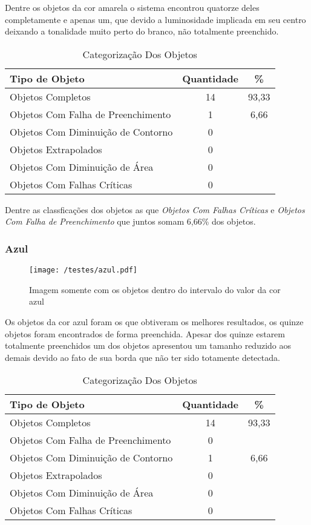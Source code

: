 	Dentre os objetos da cor amarela o sistema encontrou quatorze deles completamente e apenas um, que devido a luminosidade implicada em seu centro deixando a tonalidade muito perto do branco, não totalmente preenchido.
	
	\begin{table}[H]
\centering
\begin{tabular}{l|c|c}
Tipo de Objeto & Quantidade & \%  \\%
\hline                               %
Objetos Completos & 14 & 93,33 \\
\hline 
Objetos Com Falha de Preenchimento & 1 & 6,66 \\
\hline 
Objetos Com Diminuição de Contorno & 0 &\\
\hline 
Objetos Extrapolados & 0 &\\
\hline 
Objetos Com Diminuição de Área &  0 &\\
\hline 
Objetos Com Falhas Críticas & 0 &\\
\hline 
\end{tabular}
\caption{Categorização Dos Objetos}
\end{table}

Dentre as classficações dos objetos as que  \textit{Objetos Com Falhas Críticas} e \textit{Objetos Com Falha de Preenchimento} que juntos somam 6,66\% dos objetos.

\subsubsection{Azul}
	\begin{figure}[H]
		\centering
		\texttt{[image: /testes/azul.pdf]}
		\caption{Imagem somente com os objetos dentro do intervalo do valor da cor azul}
		\label{disposicaoparte}
	\end{figure}

Os objetos da cor azul foram os que obtiveram os melhores resultados, os quinze objetos foram encontrados de forma preenchida.	Apesar dos quinze estarem totalmente preenchidos um dos objetos apresentou um tamanho reduzido aos demais devido ao fato de sua borda que não ter sido totamente detectada.

\begin{table}[h]
\centering
\begin{tabular}{l|c|c}
Tipo de Objeto & Quantidade & \% \\ %
\hline                               %
Objetos Completos & 14 & 93,33 \\
\hline 
Objetos Com Falha de Preenchimento & 0\\
\hline 
Objetos Com Diminuição de Contorno &  1 & 6,66
\\
\hline 
Objetos Extrapolados &  0\\
\hline 
Objetos Com Diminuição de Área & 0 \\
\hline 
Objetos Com Falhas Críticas & 0 \\
\hline 
\end{tabular}
\caption{Categorização Dos Objetos}
\end{table}


